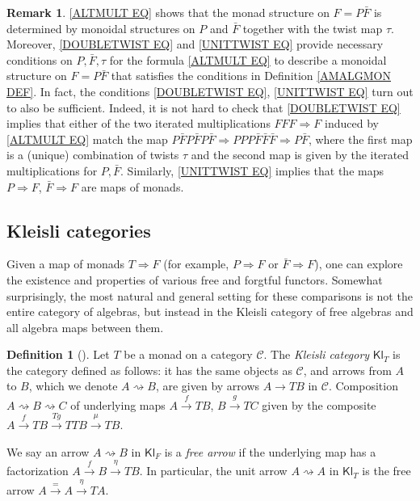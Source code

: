 \documentclass[a4paper,10pt
,draft
]{article}%
\numberwithin{equation}{section}
\numberwithin{figure}{section}
\theoremstyle{definition} %
\newtheorem{definition}[equation]{Definition}%
\newtheorem{remark}[equation]{Remark}%
\newcommand{\Kl}{\mathsf{Kl}}
\newcommand{\1}{\ensuremath{\mathbbm 1}}%
\begin{document}
\begin{remark}\label{ALTMULT REM}
\eqref{ALTMULT EQ} shows that the monad structure on $F=P\bar{F}$ is determined by monoidal structures on $P$ and $\bar{F}$ together with  the twist map $\tau$.
Moreover, \eqref{DOUBLETWIST EQ} and \eqref{UNITTWIST EQ} provide necessary conditions on $P,\bar{F},\tau$
for the formula \eqref{ALTMULT EQ}
to describe a monoidal structure on $F=P\bar{F}$
that satisfies the conditions in 
Definition \ref{AMALGMON DEF}.
In fact, the conditions \eqref{DOUBLETWIST EQ}, \eqref{UNITTWIST EQ}
turn out to also be sufficient.
Indeed, it is not hard to check 
that \eqref{DOUBLETWIST EQ} implies that either of the two iterated multiplications
$FFF \Rightarrow F$ induced by \eqref{ALTMULT EQ}
match the map 
$P\bar{F} P\bar{F} P \bar{F} \Rightarrow 
PPP \bar{F} \bar{F} \bar{F} \Rightarrow P \bar{F}$,
where the first map is a (unique) combination of twists $\tau$
and the second map is given by the iterated multiplications for $P,\bar{F}$.
Similarly, \eqref{UNITTWIST EQ} implies that the maps
$P \Rightarrow F$, $\bar{F} \Rightarrow F$
are maps of monads.
\end{remark}



\subsection{Kleisli categories}

Given a map of monads $T \Rightarrow F$ (for example, $P \Rightarrow F$ or $\bar F \Rightarrow F$), one can explore the existence and properties of various free and forgtful functors.
Somewhat surprisingly, the most natural and general setting for these comparisons is not the entire category of algebras,
but instead in the Kleisli category of free algebras and all algebra maps between them.

\begin{definition}[{\cite{Kl65}}]
      Let $T$ be a monad on a category $\mathcal C$.
      The \textit{Kleisli category} $\mathsf{Kl}_T$ is the category defined as follows:
      it has the same objects as $\mathcal{C}$,
      and arrows from $A$ to $B$,
      which we denote $A \rightsquigarrow B$,
      are given by arrows $A \to TB$ in $\mathcal{C}$.
      Composition
      $A \rightsquigarrow B \rightsquigarrow C$
      of underlying maps 
      $A \xrightarrow{f} TB$,
      $B \xrightarrow{g} TC$
      given by the composite
      $A \xrightarrow{f} TB \xrightarrow{Tg} TTB \xrightarrow{\mu} TB$.

      We say an arrow
      $A \rightsquigarrow B$ in $\mathsf{Kl}_F$ is a 
      \emph{free arrow}
      if the underlying map has a factorization
      $A \xrightarrow{f} B \xrightarrow{\eta} TB$.
      In particular, the unit arrow $A \rightsquigarrow A$ in $\Kl_T$
      is the free arrow $A \xrightarrow{=} A \xrightarrow{\eta} TA$.
\end{definition}
\end{document}
